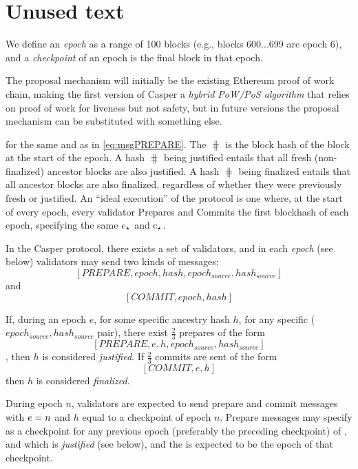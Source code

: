 \appendix
\clearpage
\section{Unused text}




We define an \textit{epoch} as a range of 100 blocks (e.g., blocks 600...699 are epoch 6), and a \textit{checkpoint} of an epoch is the final block in that epoch. 

The proposal mechanism will initially be the existing Ethereum proof of work chain, making the first version of Casper a \textit{hybrid PoW/PoS algorithm} that relies on proof of work for liveness but not safety, but in future versions the proposal mechanism can be substituted with something else.



for the same \epoch and \hash as in \eqref{eq:msgPREPARE}.  The $\hash$ is the block hash of the block at the start of the epoch.  A hash $\hash$ being justified entails that all fresh (non-finalized) ancestor blocks are also justified.  A hash $\hash$ being finalized entails that all ancestor blocks are also finalized, regardless of whether they were previously fresh or justified.  An ``ideal execution'' of the protocol is one where, at the start of every epoch, every validator Prepares and Commits the first blockhash of each epoch, specifying the same $e_{\star}\space$ and $\textnormal{c}_{\star}$.

In the Casper protocol, there exists a set of validators, and in each \textit{epoch} (see below) validators may send two kinds of messages: $$[PREPARE, epoch, hash, epoch_{source}, hash_{source}]$$ and $$[COMMIT, epoch, hash]$$


If, during an epoch $e$, for some specific ancestry hash $h$, for any specific ($epoch_{source}, hash_{source}$ pair), there exist $\frac{2}{3}$ prepares of the form $$[PREPARE, e, h, epoch_{source}, hash_{source}]$$, then $h$ is considered \textit{justified}. If $\frac{2}{3}$ commits are sent of the form $$[COMMIT, e, h]$$ then $h$ is considered \textit{finalized}.


During epoch $n$, validators are expected to send prepare and commit messages with $e = n$ and $h$ equal to a checkpoint of epoch $n$. Prepare messages may specify as \hashsource a checkpoint for any previous epoch (preferably the preceding checkpoint) of \hash, and which is \textit{justified} (see below), and the \epochsource is expected to be the epoch of that checkpoint.


